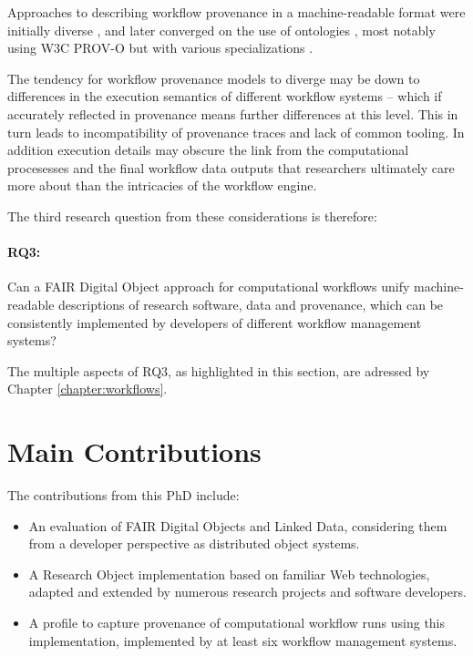 Approaches to describing workflow provenance in a machine-readable format were initially diverse \cite{Cruz 2009}, and later converged on the use of ontologies \cite{Missier 2010}, most notably using W3C PROV-O \cite{Lebo 2013a} but with various specializations \cite{Garijo 2011,Garijo 2012,Missier 2013,Belhajjame 2015,Cuevas-Vicenttín 2016}. 

The tendency for workflow provenance models to diverge may be down to differences in the execution semantics of different workflow systems -- which if accurately reflected in provenance means further differences at this level. This in turn leads to incompatibility of provenance traces and lack of common tooling. In addition execution details may obscure the link from the computational procesesses and the final workflow data outputs that researchers ultimately care more about than the intricacies of the workflow engine.

The third research question from these considerations is therefore: 

\paragraph{RQ3:} \label{rq3} Can a FAIR Digital Object approach for computational workflows unify machine-readable descriptions of research software, data and provenance, which can be consistently implemented by developers of different workflow management systems?

The multiple aspects of RQ3, as highlighted in this section, are adressed by Chapter \ref{chapter:workflows}.


\section{Main Contributions}
\label{intro:contributions}

The contributions from this PhD include:

\begin{itemize}
    \item An evaluation of FAIR Digital Objects and Linked Data, considering them from a developer perspective as distributed object systems.
    \item A Research Object implementation based on familiar Web technologies, adapted and extended by numerous research projects and software developers.
    \item A profile to capture provenance of computational workflow runs using this implementation, implemented by at least six workflow management systems.
\end{itemize}

